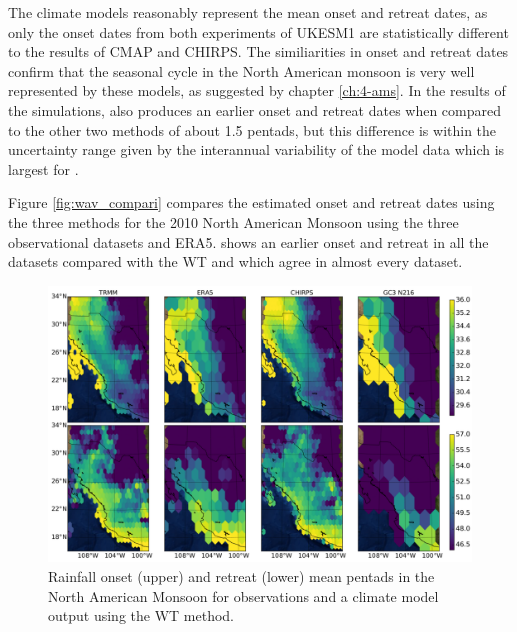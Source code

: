 The climate models reasonably represent the mean onset and retreat dates, as only the onset dates from both experiments of UKESM1 are statistically different to the results of CMAP and CHIRPS. The similiarities in onset and retreat dates confirm that the seasonal cycle in the North American monsoon is very well represented by these models, as suggested by chapter \ref{ch:4-ams}. In the results of the simulations,  also produces an earlier onset and retreat dates when compared to the other two methods of about 1.5 pentads, but this difference is within the uncertainty range given by the interannual variability of the model data which is largest for  .  

Figure \ref{fig:wav_compari} compares the estimated onset and retreat dates using the three methods for the 2010 North American Monsoon  using the three observational datasets and ERA5.  shows an earlier onset and retreat in all the datasets compared with the WT and  which agree in almost every dataset.  

\begin{figure}[t!]
\centering
 \includegraphics[width=\linewidth]{figures/map_nam_wav.pdf}
\caption[Onset and retreat spatial distribution in North American Monsoon]{ Rainfall onset (upper) and retreat (lower) mean pentads in the North American Monsoon for observations and a climate model output using the WT method.  }
\label{fig:nam_map}
\end{figure}

